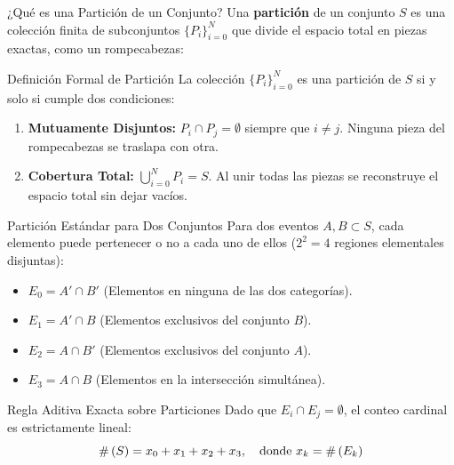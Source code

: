 \begin{frame}{¿Qué es una Partición de un Conjunto?}
  Una \textbf{partición} de un conjunto $S$ es una colección finita de subconjuntos $\{P_i\}_{i=0}^{N}$ que divide el espacio total en piezas exactas, como un rompecabezas:
  
  \vspace{0.4em}
  \begin{block}{Definición Formal de Partición}
    La colección $\{P_i\}_{i=0}^{N}$ es una partición de $S$ si y solo si cumple dos condiciones:
    \begin{enumerate}
      \item \textbf{Mutuamente Disjuntos:} $P_i \cap P_j = \emptyset$ siempre que $i \neq j$. Ninguna pieza del rompecabezas se traslapa con otra. \pause
      \item \textbf{Cobertura Total:} $\bigcup_{i=0}^{N} P_i = S$. Al unir todas las piezas se reconstruye el espacio total sin dejar vacíos.
    \end{enumerate}
  \end{block}
\end{frame}

\begin{frame}{Partición Estándar para Dos Conjuntos}
  Para dos eventos $A, B \subset S$, cada elemento puede pertenecer o no a cada uno de ellos ($2^2 = 4$ regiones elementales disjuntas):
  
  \vspace{0.3em}
  \begin{itemize}
    \item $E_0 = A' \cap B'$ \quad (Elementos en ninguna de las dos categorías). \pause
    \item $E_1 = A' \cap B$ \quad (Elementos exclusivos del conjunto $B$). \pause
    \item $E_2 = A \cap B'$ \quad (Elementos exclusivos del conjunto $A$). \pause
    \item $E_3 = A \cap B$ \quad (Elementos en la intersección simultánea).
  \end{itemize}
  
  \vspace{0.3em}
  \pause
  \begin{block}{Regla Aditiva Exacta sobre Particiones}
    Dado que $E_i \cap E_j = \emptyset$, el conteo cardinal es estrictamente lineal:
    \[ \#\left( S \right) = x_0 + x_1 + x_2 + x_3, \quad \text{donde } x_k = \#\left( E_k \right) \]
  \end{block}
\end{frame}

